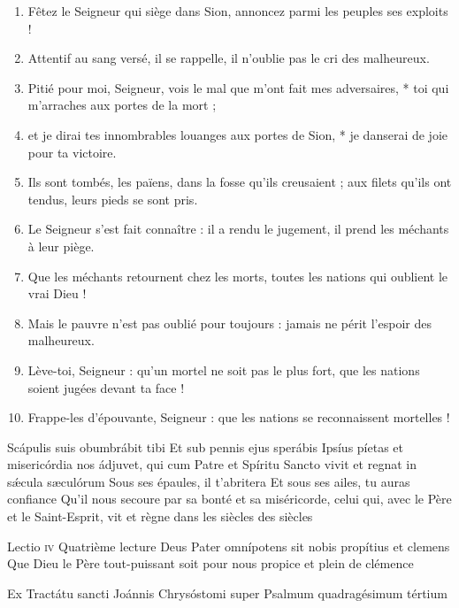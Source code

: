 \documentclass[twoside]{article}
\begin{document}
\begin{paracol}[1]{2}
\begin{enumerate}[wide, itemsep=0mm, labelwidth=!, labelindent=0pt, label=\color{gregoriocolor}\theenumi]
\item Fêtez le Seigneur qui siège dans Sion, annoncez parmi les peuples ses exploits !
\item Attentif au sang versé, il se rappelle, il n'oublie pas le cri des malheureux.
\item Pitié pour moi, Seigneur, vois le mal que m'ont fait mes adversaires, * toi qui m'arraches aux portes de la mort ;
\item et je dirai tes innombrables louanges aux portes de Sion, * je danserai de joie pour ta victoire.
\item Ils sont tombés, les païens, dans la fosse qu'ils creusaient ; aux filets qu'ils ont tendus, leurs pieds se sont pris.
\item Le Seigneur s'est fait connaître : il a rendu le jugement, il prend les méchants à leur piège.
\item Que les méchants retournent chez les morts, toutes les nations qui oublient le vrai Dieu !
\item Mais le pauvre n'est pas oublié pour toujours : jamais ne périt l'espoir des malheureux.
\item Lève-toi, Seigneur : qu'un mortel ne soit pas le plus fort, que les nations soient jugées devant ta face !
\item Frappe-les d'épouvante, Seigneur : que les nations se reconnaissent mortelles !
\end{enumerate}

\switchcolumn*

\versiculusabsolutio
	{Scápulis suis obumbrábit tibi}
	{Et sub pennis ejus sperábis}
	{Ipsíus píetas et misericórdia nos ádjuvet, qui cum Patre et Spíritu Sancto vivit et regnat in sǽcula sæculórum}
	{Sous ses épaules, il t’abritera}
	{Et sous ses ailes, tu auras confiance}
	{Qu'il nous secoure par sa bonté et sa miséricorde, celui qui, avec le Père et le Saint-Esprit, vit et règne dans les siècles des siècles}

\lectioresponsorium
	{Lectio \textsc{iv}}
	{Quatrième lecture}
	{Deus Pater omnípotens sit nobis propítius et clemens}
	{Que Dieu le Père tout-puissant soit pour nous propice et plein de clémence}
	{
		Ex Tractátu sancti Joánnis Chrysóstomi super Psalmum quadragésimum tértium

}
\end{paracol}
\end{document}
